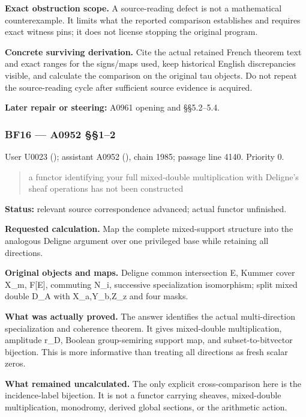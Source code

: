\textbf{Exact obstruction scope.} A source-reading defect is not a
mathematical counterexample. It limits what the reported comparison
establishes and requires exact witness pins; it does not license
stopping the original program.

\textbf{Concrete surviving derivation.} Cite the actual retained French
theorem text and exact ranges for the signs/maps used, keep historical
English discrepancies visible, and calculate the comparison on the
original tau objects. Do not repeat the source-reading cycle after
sufficient source evidence is acquired.

\textbf{Later repair or steering:} A0961 opening and §§5.2--5.4.

\subsubsection{BF16 --- A0952 §§1--2}\label{TranscriptLedgerStage:bf16-a0952-12}

User U0023 (\protect{});
assistant A0952 (\protect{}),
chain 1985; passage line 4140. Priority 0.

\begin{quote}
a functor identifying your full mixed-double multiplication with
Deligne's sheaf operations has not been constructed
\end{quote}

\textbf{Status:} relevant source correspondence advanced; actual functor
unfinished.

\textbf{Requested calculation.} Map the complete mixed-support structure
into the analogous Deligne argument over one privileged base while
retaining all directions.

\textbf{Original objects and maps.} Deligne common intersection E,
Kummer cover X\_m, F{[}E{]}, commuting N\_i, successive specialization
isomorphism; split mixed double D\_A with X\_a,Y\_b,Z\_z and four masks.

\textbf{What was actually proved.} The answer identifies the actual
multi-direction specialization and coherence theorem. It gives
mixed-double multiplication, amplitude r\_D, Boolean group-semiring
support map, and subset-to-bitvector bijection. This is more informative
than treating all directions as fresh scalar zeros.

\textbf{What remained uncalculated.} The only explicit cross-comparison
here is the incidence-label bijection. It is not a functor carrying
sheaves, mixed-double multiplication, monodromy, derived global
sections, or the arithmetic action.

